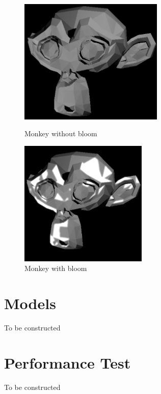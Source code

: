 \documentclass{article}
\begin{document}
    \begin{figure}[!htb]
          \includegraphics[width=\linewidth , height=6cm]{images/monkey_no_bloom.png}
          \caption*{Monkey without bloom}
        \endminipage\hfill
          \includegraphics[width=\linewidth , height=6cm]{images/monkey_bloom.png}
          \caption*{Monkey with bloom}
        \endminipage
    \end{figure}

    \section{Models}
    To be constructed

    \section{Performance Test}
    To be constructed
\end{document}
